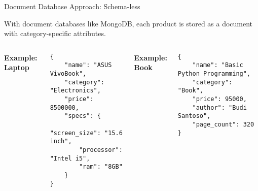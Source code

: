 \documentclass[aspectratio=169, table]{beamer}
\begin{document}
\begin{frame}[fragile]{Document Database Approach: Schema-less}
	\vspace{20pt}
	
	With document databases like MongoDB, each product is stored as a document with category-specific attributes.
	
	\begin{columns}[T]
		
		\textbf{Example: Laptop}
\begin{lstlisting}[style=JavaScript, basicstyle=\ttfamily\scriptsize]
{
	"name": "ASUS VivoBook",
	"category": "Electronics",
	"price": 8500000,
	"specs": {
		"screen_size": "15.6 inch",
		"processor": "Intel i5",
		"ram": "8GB"
	}
}
\end{lstlisting}

\textbf{Example: Book}
\begin{lstlisting}[style=JavaScript, basicstyle=\ttfamily\scriptsize]
{
	"name": "Basic Python Programming",
	"category": "Book",
	"price": 95000,
	"author": "Budi Santoso",
	"page_count": 320
}
\end{lstlisting}

\end{columns}
	
\end{frame}
\end{document}
